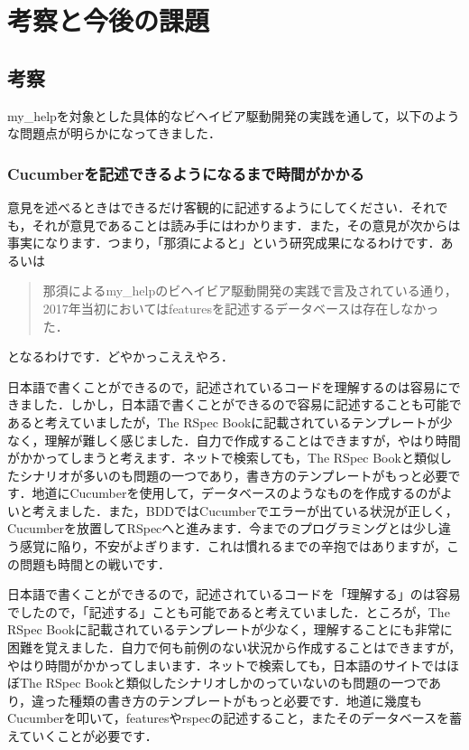 \section{考察と今後の課題}
\subsection{考察}
my\_helpを対象とした具体的なビヘイビア駆動開発の実践を通して，以下のような問題点が明らかになってきました．

\subsubsection{Cucumberを記述できるようになるまで時間がかかる}
意見を述べるときはできるだけ客観的に記述するようにしてください．それでも，それが意見であることは読み手にはわかります．また，その意見が次からは事実になります．つまり，「那須によると」という研究成果になるわけです．あるいは

\begin{quotation}
那須によるmy\_helpのビヘイビア駆動開発の実践で言及されている通り，2017年当初においてはfeaturesを記述するデータベースは存在しなかった．

\end{quotation}
となるわけです．どやかっこええやろ．

日本語で書くことができるので，記述されているコードを理解するのは容易にできました．しかし，日本語で書くことができるので容易に記述することも可能であると考えていましたが，The RSpec Bookに記載されているテンプレートが少なく，理解が難しく感じました．自力で作成することはできますが，やはり時間がかかってしまうと考えます．ネットで検索しても，The RSpec Bookと類似したシナリオが多いのも問題の一つであり，書き方のテンプレートがもっと必要です．地道にCucumberを使用して，データベースのようなものを作成するのがよいと考えました．また，BDDではCucumberでエラーが出ている状況が正しく，Cucumberを放置してRSpecへと進みます．今までのプログラミングとは少し違う感覚に陥り，不安がよぎります．これは慣れるまでの辛抱ではありますが，この問題も時間との戦いです．

日本語で書くことができるので，記述されているコードを「理解する」のは容易でしたので，「記述する」ことも可能であると考えていました．ところが，The RSpec Book\cite{RSpecBook}に記載されているテンプレートが少なく，理解することにも非常に困難を覚えました．自力で何も前例のない状況から作成することはできますが，やはり時間がかかってしまいます．ネットで検索しても，日本語のサイトではほぼThe RSpec Book\cite{RSpecBook}と類似したシナリオしかのっていないのも問題の一つであり，違った種類の書き方のテンプレートがもっと必要です．地道に幾度もCucumberを叩いて，featuresやrspecの記述すること，またそのデータベースを蓄えていくことが必要です．

